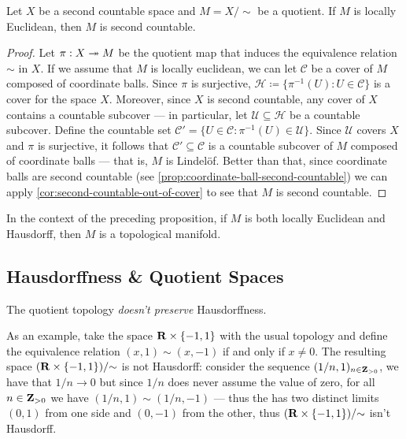 \begin{proposition}
\label{prop:quot-second-count-locall-euclidean}
Let \(X\) be a second countable space and \(M = X / {\sim}\) be a quotient. If
\(M\) is locally Euclidean, then \(M\) is second countable.
\end{proposition}

\begin{proof}
Let \(\pi: X \twoheadrightarrow M\) be the quotient map that induces the equivalence
relation \(\sim\) in \(X\). If we assume that \(M\) is locally euclidean, we can
let \(\mathcal{C}\) be a cover of \(M\) composed of coordinate balls. Since
\(\pi\) is surjective, \(\mathcal H \coloneq \{\pi^{-1}(U) \colon U \in
\mathcal{C}\}\) is a cover for the space \(X\). Moreover, since \(X\) is second
countable, any cover of \(X\) contains a countable subcover --- in particular,
let \(\mathcal U \subseteq \mathcal H\) be a countable subcover. Define the
countable set \(\mathcal{C}' = \{U \in \mathcal{C} \colon \pi^{-1}(U) \in
\mathcal{U}\}\). Since \(\mathcal{U}\) covers \(X\) and \(\pi\) is surjective,
it follows that \(\mathcal{C}' \subseteq \mathcal{C}\) is a countable subcover
of \(M\) composed of coordinate balls --- that is, \(M\) is Lindelöf. Better
than that, since coordinate balls are second countable (see
\cref{prop:coordinate-ball-second-countable}) we can apply
\cref{cor:second-countable-out-of-cover} to see that \(M\) is second
countable.
\end{proof}

\begin{corollary}
\label{cor:manifold-from-quotient}
In the context of the preceding proposition, if \(M\) is both locally Euclidean
and Hausdorff, then \(M\) is a topological manifold.
\end{corollary}

\subsection{Hausdorffness \& Quotient Spaces}

\begin{remark}
\label{rem:quotient-doesnt-preserve-hausdorff}
The quotient topology \emph{doesn't preserve} Hausdorffness.

As an example, take the space \(\mathbf{R} \times \{-1, 1\}\) with the usual topology
and define the equivalence relation \((x, 1) \sim (x, -1)\) if and only if
\(x \neq 0\). The resulting space \((\mathbf{R} \times \{-1, 1\})/{\sim}\) is not
Hausdorff: consider the sequence \((1/n, 1)_{n \in \mathbf{Z}_{>0}}\), we have that
\(1/n \to 0\) but since \(1/n\) does never assume the value of zero, for all
\(n \in \mathbf{Z}_{>0}\) we have \((1/n, 1) \sim (1/n, -1)\) --- thus the has two
distinct limits \((0, 1)\) from one side and \((0, -1)\) from the other, thus
\((\mathbf{R} \times \{-1, 1\})/{\sim}\) isn't Hausdorff.
\end{remark}

